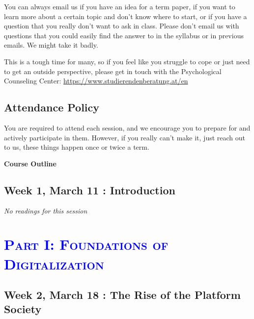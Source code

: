 \documentclass[12pt,]{article}
\begin{document}
You can always email us if you have an idea for a term paper, if you
want to learn more about a certain topic and don't know where to start,
or if you have a question that you really don't want to ask in class.
Please don't email us with questions that you could easily find the
answer to in the syllabus or in previous emails. We might take it badly.

This is a tough time for many, so if you feel like you struggle to cope
or just need to get an outside perspective, please get in touch with the
Psychological Counseling Center:
\url{https://www.studierendenberatung.at/en}

\hypertarget{attendance-policy}{%
\subsection{Attendance Policy}\label{attendance-policy}}

You are required to attend each session, and we encourage you to prepare
for and actively participate in them. However, if you really can't make
it, just reach out to us, these things happen once or twice a term.

\newpage

\begingroup\huge

\textbf{Course Outline} \endgroup

\vspace{0.25cm}

\hypertarget{week-1-march-11-introduction}{%
\subsection{Week 1, March 11 :
Introduction}\label{week-1-march-11-introduction}}

\emph{No readings for this session}

\hypertarget{section}{%
\section{\texorpdfstring{\textcolor{Blue}{\textsc{Part I: Foundations of Digitalization}}}{}}\label{section}}

\vspace{0.5cm}

\hypertarget{week-2-march-18-the-rise-of-the-platform-society}{%
\subsection{Week 2, March 18 : The Rise of the Platform
Society}\label{week-2-march-18-the-rise-of-the-platform-society}}
\end{document}
